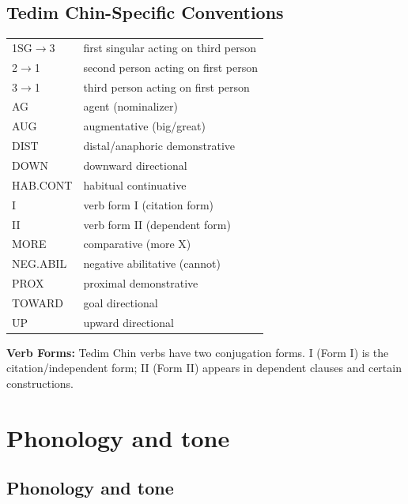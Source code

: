 \documentclass[
  11pt,
  a4paper,
]{article}
\renewcommand{\textsc}[1]{{\footnotesize\MakeUppercase{#1}}}
\newcounter{reviewchapter}
\newcommand{\reviewchapterbreak}{\stepcounter{reviewchapter}\setcounter{xnumi}{0}}
\begin{document}
\vspace{1em}
\subsection*{Tedim Chin-Specific Conventions}
\begin{tabular}{@{}ll@{}}
\textsc{1sg$\rightarrow$3} & first singular acting on third person \\
\textsc{2$\rightarrow$1} & second person acting on first person \\
\textsc{3$\rightarrow$1} & third person acting on first person \\
\textsc{ag} & agent (nominalizer) \\
\textsc{aug} & augmentative (big/great) \\
\textsc{dist} & distal/anaphoric demonstrative \\
\textsc{down} & downward directional \\
\textsc{hab.cont} & habitual continuative \\
\textsc{i} & verb form I (citation form) \\
\textsc{ii} & verb form II (dependent form) \\
\textsc{more} & comparative (more X) \\
\textsc{neg.abil} & negative abilitative (cannot) \\
\textsc{prox} & proximal demonstrative \\
\textsc{toward} & goal directional \\
\textsc{up} & upward directional \\
\end{tabular}

\vspace{1em}
\noindent\textbf{Verb Forms:} Tedim Chin verbs have two conjugation forms.
\textsc{i} (Form I) is the citation/independent form; \textsc{ii} (Form II)
appears in dependent clauses and certain constructions.

\reviewchapterbreak

\section{Phonology and tone}\label{phonology-and-tone}

\subsection{Phonology and tone}\label{phonology-and-tone-1}
\end{document}
